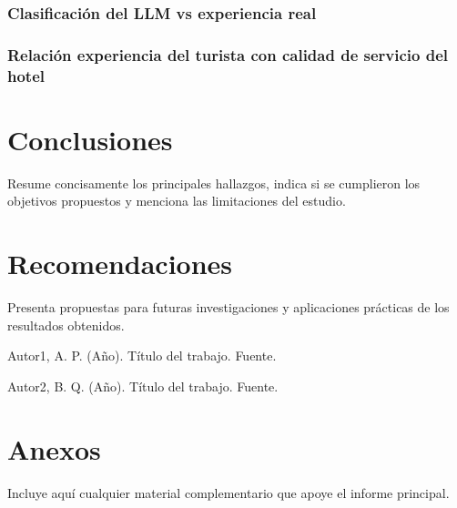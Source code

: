 \documentclass[12pt,a4paper]{article} \usepackage[spanish]{babel} \usepackage{graphicx} \usepackage{amsmath} \usepackage{amsfonts} \usepackage{amssymb} \usepackage{float} \usepackage{geometry}
\begin{document}
\subsubsection{Clasificación del LLM vs experiencia real}
\subsubsection{Relación experiencia del turista con calidad de servicio del hotel}

\section{Conclusiones}

Resume concisamente los principales hallazgos, indica si se cumplieron los objetivos propuestos y menciona las limitaciones del estudio.

\section{Recomendaciones}

Presenta propuestas para futuras investigaciones y aplicaciones prácticas de los resultados obtenidos.

\vspace{-1em} \hrulefill

\begin{thebibliography}{99}

 Autor1, A. P. (Año). Título del trabajo. Fuente.

 Autor2, B. Q. (Año). Título del trabajo. Fuente.

\end{thebibliography}

\vspace{-1em} \hrulefill

\appendix

\section{Anexos}

Incluye aquí cualquier material complementario que apoye el informe principal.
\end{document}
